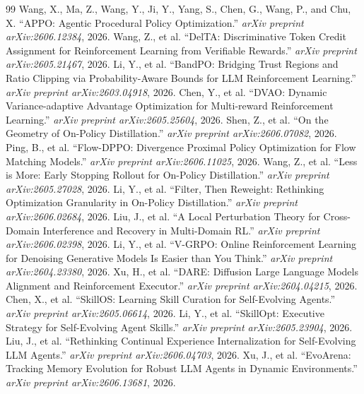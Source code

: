 \documentclass[11pt,a4paper]{article}
\begin{document}
\begin{thebibliography}{99}
 Wang, X., Ma, Z., Wang, Y., Ji, Y., Yang, S., Chen, G., Wang, P., and Chu, X. ``APPO: Agentic Procedural Policy Optimization.'' \emph{arXiv preprint arXiv:2606.12384}, 2026.
 Wang, Z., et al. ``DelTA: Discriminative Token Credit Assignment for Reinforcement Learning from Verifiable Rewards.'' \emph{arXiv preprint arXiv:2605.21467}, 2026.
 Li, Y., et al. ``BandPO: Bridging Trust Regions and Ratio Clipping via Probability-Aware Bounds for LLM Reinforcement Learning.'' \emph{arXiv preprint arXiv:2603.04918}, 2026.
 Chen, Y., et al. ``DVAO: Dynamic Variance-adaptive Advantage Optimization for Multi-reward Reinforcement Learning.'' \emph{arXiv preprint arXiv:2605.25604}, 2026.
 Shen, Z., et al. ``On the Geometry of On-Policy Distillation.'' \emph{arXiv preprint arXiv:2606.07082}, 2026.
 Ping, B., et al. ``Flow-DPPO: Divergence Proximal Policy Optimization for Flow Matching Models.'' \emph{arXiv preprint arXiv:2606.11025}, 2026.
 Wang, Z., et al. ``Less is More: Early Stopping Rollout for On-Policy Distillation.'' \emph{arXiv preprint arXiv:2605.27028}, 2026.
 Li, Y., et al. ``Filter, Then Reweight: Rethinking Optimization Granularity in On-Policy Distillation.'' \emph{arXiv preprint arXiv:2606.02684}, 2026.
 Liu, J., et al. ``A Local Perturbation Theory for Cross-Domain Interference and Recovery in Multi-Domain RL.'' \emph{arXiv preprint arXiv:2606.02398}, 2026.
 Li, Y., et al. ``V-GRPO: Online Reinforcement Learning for Denoising Generative Models Is Easier than You Think.'' \emph{arXiv preprint arXiv:2604.23380}, 2026.
 Xu, H., et al. ``DARE: Diffusion Large Language Models Alignment and Reinforcement Executor.'' \emph{arXiv preprint arXiv:2604.04215}, 2026.
 Chen, X., et al. ``SkillOS: Learning Skill Curation for Self-Evolving Agents.'' \emph{arXiv preprint arXiv:2605.06614}, 2026.
 Li, Y., et al. ``SkillOpt: Executive Strategy for Self-Evolving Agent Skills.'' \emph{arXiv preprint arXiv:2605.23904}, 2026.
 Liu, J., et al. ``Rethinking Continual Experience Internalization for Self-Evolving LLM Agents.'' \emph{arXiv preprint arXiv:2606.04703}, 2026.
 Xu, J., et al. ``EvoArena: Tracking Memory Evolution for Robust LLM Agents in Dynamic Environments.'' \emph{arXiv preprint arXiv:2606.13681}, 2026.
\end{thebibliography}
\end{document}
